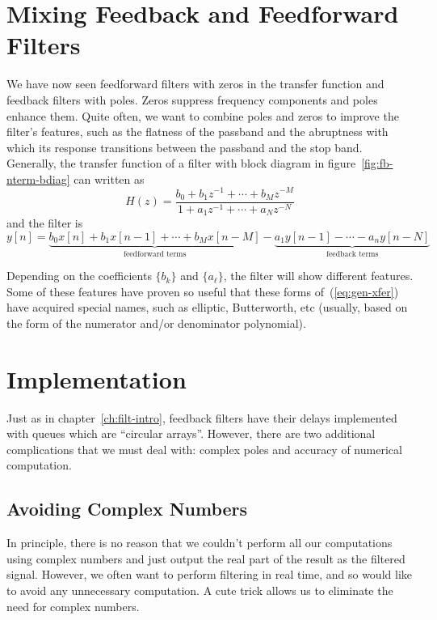 \section{Mixing Feedback and Feedforward Filters}

We have now seen feedforward filters with zeros in the transfer
function and feedback filters with poles. Zeros suppress frequency
components and poles enhance them.  Quite often, we want to combine
poles and zeros to improve the filter's features, such as the flatness
of the passband and the abruptness with which its response transitions
between the passband and the stop band.  Generally, the transfer
function of a filter with block diagram in
figure~\ref{fig:fb-nterm-bdiag} can written as
\begin{equation}
H(z)=\frac{b_0+b_1z^{-1}+\cdots+b_Mz^{-M}}{1+a_1z^{-1}+\cdots+a_Nz^{-N}}
\label{eq:gen-xfer}
\end{equation}
and the filter is  
\begin{equation}
y[n] = \underbrace{b_0x[n] + b_1x[n-1] + \cdots +
      b_Mx[n-M]}_{\text{feedforward terms}}
      - 
      \underbrace{a_1y[n-1] - \cdots - a_ny[n-N]}_{\text{feedback terms}}
\label{eq:gen-impl}
\end{equation}

Depending on the coefficients $\{b_k\}$ and $\{a_\ell\}$, the
filter will show different features. Some of these features have
proven so useful that these forms of~(\ref{eq:gen-xfer}) have acquired
special names, such as elliptic, Butterworth, etc (usually, based on
the form of the numerator and/or denominator polynomial).

\section{Implementation}

Just as in chapter~\ref{ch:filt-intro}, feedback filters have their
delays implemented with queues which are ``circular arrays''.
However, there are two additional complications that we must deal
with: complex poles and accuracy of numerical computation.

\subsection{Avoiding Complex Numbers}

In principle, there is no reason that we couldn't perform all our
computations using complex numbers and just output the real part of
the result as the filtered signal.  However, we often want to perform
filtering in real time, and so would like to avoid any unnecessary
computation. A cute trick allows us to eliminate the need for complex
numbers.

